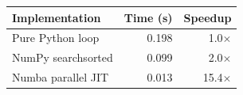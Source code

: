 \begin{tabular}{lrr}
\toprule
Implementation & Time (s) & Speedup \\
\midrule
Pure Python loop & 0.198 & 1.0$\times$ \\
NumPy searchsorted & 0.099 & 2.0$\times$ \\
Numba parallel JIT & 0.013 & 15.4$\times$ \\
\bottomrule
\end{tabular}